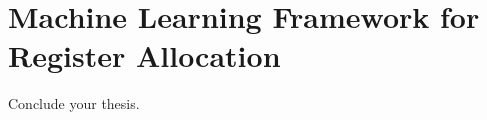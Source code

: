 \chapter{Machine Learning Framework for Register Allocation}
\label{chap:ch5}

Conclude your thesis.